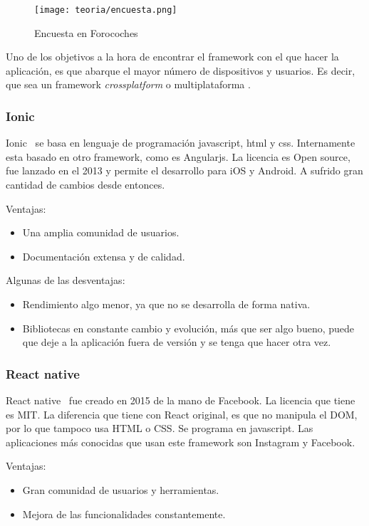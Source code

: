 \begin{figure}[h]
	\centering
	\texttt{[image: teoria/encuesta.png]}
	\caption{Encuesta en Forocoches}\label{fig:encuesta}
\end{figure}

Uno de los objetivos a la hora de encontrar el framework con el que hacer la aplicación, es que abarque el mayor número de dispositivos y usuarios. Es decir, que sea un framework \emph{crossplatform} o multiplataforma .

\subsubsection{Ionic}
Ionic~\cite{wiki:ionnic} se basa en lenguaje de programación javascript, html y css. Internamente esta basado en otro framework, como es Angularjs. La licencia es Open source, fue lanzado en el 2013 y permite el desarrollo para iOS y Android. A sufrido gran cantidad de cambios desde entonces.

Ventajas:
\begin{itemize}
	\item Una amplia comunidad de usuarios.
	\item Documentación extensa y de calidad.
\end{itemize}

Algunas de las desventajas:
\begin{itemize}
	\item Rendimiento algo menor, ya que no se desarrolla de forma nativa.
	\item Bibliotecas en constante cambio y evolución, más que ser algo bueno, puede que deje a la aplicación fuera de versión y se tenga que hacer otra vez.
\end{itemize}

\subsubsection{React native}
React native~\cite{wiki:react} fue creado en 2015 de la mano de Facebook. La licencia que tiene es MIT. La diferencia que tiene con React original, es que no manipula el DOM, por lo que tampoco usa HTML o CSS. 
Se programa en javascript. Las aplicaciones más conocidas que usan este framework son Instagram y Facebook.

Ventajas:
\begin{itemize}
	\item Gran comunidad de usuarios y herramientas.
	\item Mejora de las funcionalidades constantemente.
\end{itemize}

